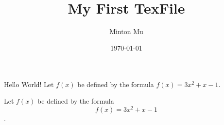 \documentclass{article} %
\title{My First TexFile}   %
\author{Minton Mu}          %
\date{\today}               %
\begin{document}
\maketitle
 Hello World!
 Let $f(x)$ be defined by the formula $f(x)=3x^2+x-1$.

 Let $f(x)$ be defined by the formula $$f(x)=3x^2+x-1$$.
\end{document}
